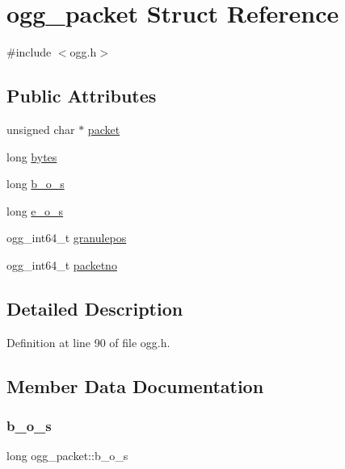 \hypertarget{structogg__packet}{}\section{ogg\+\_\+packet Struct Reference}
\label{structogg__packet}


{\ttfamily \#include $<$ogg.\+h$>$}

\subsection*{Public Attributes}
\begin{DoxyCompactItemize}
\item 
unsigned char $\ast$ \mbox{\hyperlink{structogg__packet_a57e7096985ec8766dce415e248767c32}{packet}}
\item 
long \mbox{\hyperlink{structogg__packet_a4438269ce6025d8817865ae66d5881f1}{bytes}}
\item 
long \mbox{\hyperlink{structogg__packet_adbf12677237d6f5333017de9b59b4ea7}{b\+\_\+o\+\_\+s}}
\item 
long \mbox{\hyperlink{structogg__packet_aa367e7c5425c5f65cbd126b82dfc72e8}{e\+\_\+o\+\_\+s}}
\item 
ogg\+\_\+int64\+\_\+t \mbox{\hyperlink{structogg__packet_a838d9a000e08bae982409bc2734fc566}{granulepos}}
\item 
ogg\+\_\+int64\+\_\+t \mbox{\hyperlink{structogg__packet_a60e257b3a8f843135474457197c65a45}{packetno}}
\end{DoxyCompactItemize}


\subsection{Detailed Description}


Definition at line 90 of file ogg.\+h.



\subsection{Member Data Documentation}
\mbox{\label{structogg__packet_adbf12677237d6f5333017de9b59b4ea7}} 
\subsubsection{\texorpdfstring{b\_o\_s}{b\_o\_s}}
{\footnotesize\ttfamily long ogg\+\_\+packet\+::b\+\_\+o\+\_\+s}



